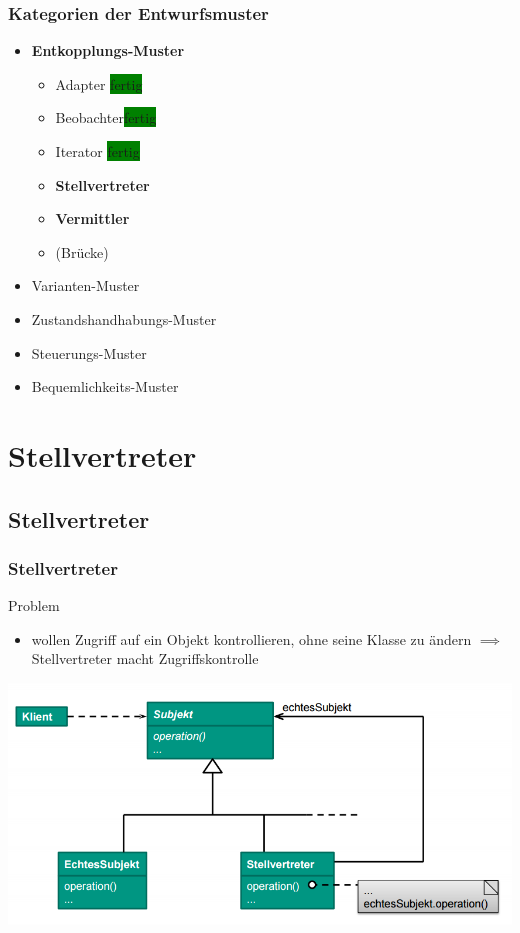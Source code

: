 \documentclass[18pt]{beamer}
\begin{document}
	\begin{frame}
		\frametitle{Kategorien der Entwurfsmuster}
		\begin{itemize}
			\item \textbf{Entkopplungs-Muster}
			\begin{itemize}
				\item Adapter \colorbox{green}{fertig}
				\item Beobachter\colorbox{green}{fertig}
				\item Iterator \colorbox{green}{fertig}
				\item \textbf{Stellvertreter}
				\item \textbf{Vermittler}
				\item (Brücke)
			\end{itemize}
			\item Varianten-Muster
			\item Zustandshandhabungs-Muster
			\item Steuerungs-Muster
			\item Bequemlichkeits-Muster
		\end{itemize}
	\end{frame}


\section{Stellvertreter}
	\subsection{Stellvertreter}
	\begin{frame}
		\frametitle{Stellvertreter}
		\begin{block}{Problem}
			\begin{itemize}
				\item wollen Zugriff auf ein Objekt kontrollieren, ohne seine Klasse zu ändern \linebreak \pause $\implies$ Stellvertreter macht Zugriffskontrolle
			\end{itemize}
		\end{block}
		\pause
		\centering
		\includegraphics[scale=0.4]{./pics/tut3/prox.png}
	\end{frame}
\end{document}
